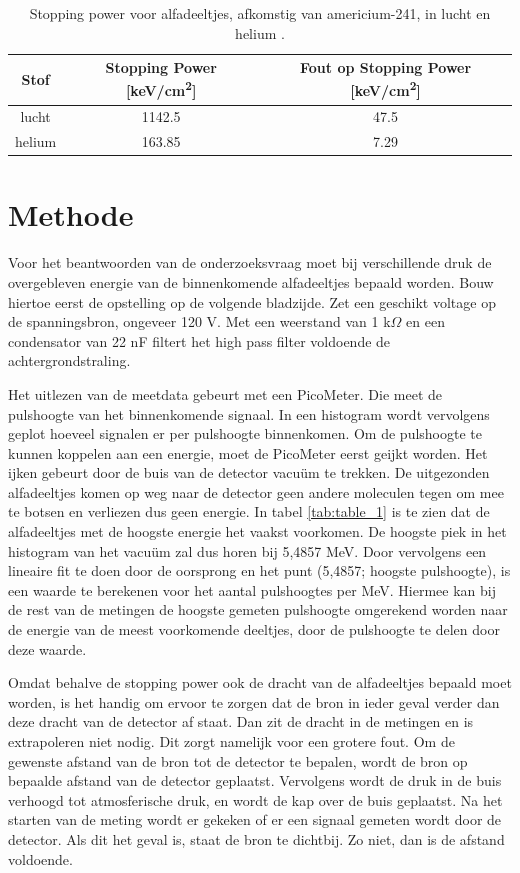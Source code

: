 \documentclass[11pt,a4paper]{article}
\begin{document}
\begin{table}
\caption{Stopping power voor alfadeeltjes, afkomstig van americium-241, in lucht \cite{StoppingPowerAir} en helium \cite{StoppingPowerHelium}.}
\centering
\begin{tabular}{SSS}
\toprule
{Stof} & {Stopping Power [\si{keV/cm^2}]} & {Fout op Stopping Power [\si{keV/cm^2}]} \\
\midrule
{lucht} &  1142.5 & 47.5\\
{helium} &  163.85 & 7.29\\
\bottomrule
\end{tabular}
\label{tab:table_2}
\end{table}

\section{Methode}
Voor het beantwoorden van de onderzoeksvraag moet bij verschillende druk de overgebleven energie van de binnenkomende alfadeeltjes bepaald worden. Bouw hiertoe eerst de opstelling op de volgende bladzijde. Zet een geschikt voltage op de spanningsbron, ongeveer 120 V. Met een weerstand van 1 k$\Omega$ en een condensator van 22 nF filtert het high pass filter voldoende de achtergrondstraling. \par
Het uitlezen van de meetdata gebeurt met een PicoMeter. Die meet de pulshoogte van het binnenkomende signaal. In een histogram wordt vervolgens geplot hoeveel signalen er per pulshoogte binnenkomen. Om de pulshoogte te kunnen koppelen aan een energie, moet de PicoMeter eerst geijkt worden.
Het ijken gebeurt door de buis van de detector vacuüm te trekken. De uitgezonden alfadeeltjes komen op weg naar de detector geen andere moleculen tegen om mee te botsen en verliezen dus geen energie. In tabel \ref{tab:table_1} is te zien dat de alfadeeltjes met de hoogste energie het vaakst voorkomen. De hoogste piek in het histogram van het vacuüm zal dus horen bij 5,4857 MeV. Door vervolgens een lineaire fit te doen door de oorsprong en het punt (5,4857; hoogste pulshoogte), is een waarde te berekenen voor het aantal pulshoogtes per MeV. Hiermee kan bij de rest van de metingen de hoogste gemeten pulshoogte omgerekend worden naar de energie van de meest voorkomende deeltjes, door de pulshoogte te delen door deze waarde.\par 
Omdat behalve de stopping power ook de dracht van de alfadeeltjes bepaald moet worden, is het handig om ervoor te zorgen dat de bron in ieder geval verder dan deze dracht van de detector af staat. Dan zit de dracht in de metingen en is extrapoleren niet nodig. Dit zorgt namelijk voor een grotere fout. Om de gewenste afstand van de bron tot de detector te bepalen, wordt de bron op bepaalde afstand van de detector geplaatst. Vervolgens wordt de druk in de buis verhoogd tot atmosferische druk, en wordt de kap over de buis geplaatst. Na het starten van de meting wordt er gekeken of er een signaal gemeten wordt door de detector. Als dit het geval is, staat de bron te dichtbij. Zo niet, dan is de afstand voldoende.\par
\end{document}
